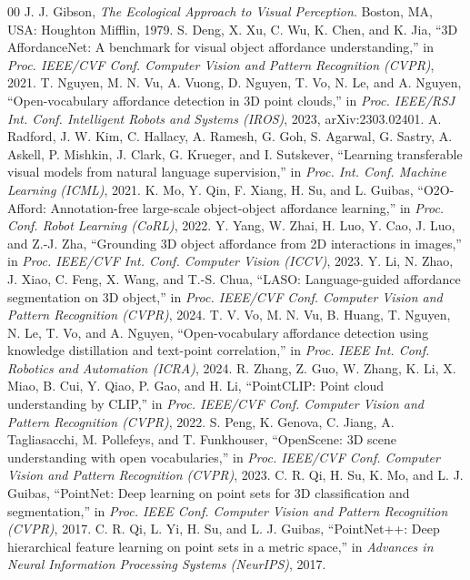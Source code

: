 \documentclass[conference]{IEEEtran}
\begin{document}
\begin{thebibliography}{00}
 J. J. Gibson, \emph{The Ecological Approach to Visual Perception}. Boston, MA, USA: Houghton Mifflin, 1979.
 S. Deng, X. Xu, C. Wu, K. Chen, and K. Jia, ``3D AffordanceNet: A benchmark for visual object affordance understanding,'' in \emph{Proc. IEEE/CVF Conf. Computer Vision and Pattern Recognition (CVPR)}, 2021.
 T. Nguyen, M. N. Vu, A. Vuong, D. Nguyen, T. Vo, N. Le, and A. Nguyen, ``Open-vocabulary affordance detection in 3D point clouds,'' in \emph{Proc. IEEE/RSJ Int. Conf. Intelligent Robots and Systems (IROS)}, 2023, arXiv:2303.02401.
 A. Radford, J. W. Kim, C. Hallacy, A. Ramesh, G. Goh, S. Agarwal, G. Sastry, A. Askell, P. Mishkin, J. Clark, G. Krueger, and I. Sutskever, ``Learning transferable visual models from natural language supervision,'' in \emph{Proc. Int. Conf. Machine Learning (ICML)}, 2021.
 K. Mo, Y. Qin, F. Xiang, H. Su, and L. Guibas, ``O2O-Afford: Annotation-free large-scale object-object affordance learning,'' in \emph{Proc. Conf. Robot Learning (CoRL)}, 2022.
 Y. Yang, W. Zhai, H. Luo, Y. Cao, J. Luo, and Z.-J. Zha, ``Grounding 3D object affordance from 2D interactions in images,'' in \emph{Proc. IEEE/CVF Int. Conf. Computer Vision (ICCV)}, 2023.
 Y. Li, N. Zhao, J. Xiao, C. Feng, X. Wang, and T.-S. Chua, ``LASO: Language-guided affordance segmentation on 3D object,'' in \emph{Proc. IEEE/CVF Conf. Computer Vision and Pattern Recognition (CVPR)}, 2024.
 T. V. Vo, M. N. Vu, B. Huang, T. Nguyen, N. Le, T. Vo, and A. Nguyen, ``Open-vocabulary affordance detection using knowledge distillation and text-point correlation,'' in \emph{Proc. IEEE Int. Conf. Robotics and Automation (ICRA)}, 2024.
 R. Zhang, Z. Guo, W. Zhang, K. Li, X. Miao, B. Cui, Y. Qiao, P. Gao, and H. Li, ``PointCLIP: Point cloud understanding by CLIP,'' in \emph{Proc. IEEE/CVF Conf. Computer Vision and Pattern Recognition (CVPR)}, 2022.
 S. Peng, K. Genova, C. Jiang, A. Tagliasacchi, M. Pollefeys, and T. Funkhouser, ``OpenScene: 3D scene understanding with open vocabularies,'' in \emph{Proc. IEEE/CVF Conf. Computer Vision and Pattern Recognition (CVPR)}, 2023.
 C. R. Qi, H. Su, K. Mo, and L. J. Guibas, ``PointNet: Deep learning on point sets for 3D classification and segmentation,'' in \emph{Proc. IEEE Conf. Computer Vision and Pattern Recognition (CVPR)}, 2017.
 C. R. Qi, L. Yi, H. Su, and L. J. Guibas, ``PointNet++: Deep hierarchical feature learning on point sets in a metric space,'' in \emph{Advances in Neural Information Processing Systems (NeurIPS)}, 2017.

\end{thebibliography}
\end{document}

